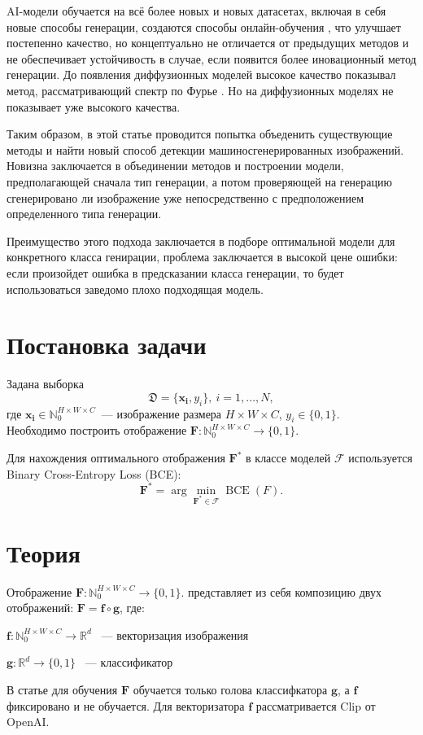 \documentclass{article}
\begin{document}
AI-модели обучается на всё более новых и новых датасетах, включая в себя новые способы генерации, создаются способы онлайн-обучения \cite{OnlineDetection}, что улучшает постепенно качество, но концептуально не отличается от предыдущих методов и не обеспечивает устойчивость в случае, если появится более иновационный метод генерации. До появления диффузионных моделей высокое качество показывал метод, рассматривающий спектр по Фурье \cite{ZeroShot}. Но на диффузионных моделях не показывает уже высокого качества.

Таким образом, в этой статье проводится попытка объеденить существующие методы и найти новый способ детекции машиносгенерированных изображений. Новизна заключается в объединении методов и построении модели, предполагающей сначала тип генерации, а потом проверяющей на генерацию сгенерировано ли изображение уже непосредственно с предположением определенного типа генерации.

Преимущество этого подхода заключается в подборе оптимальной модели для конкретного класса генирации, проблема заключается в высокой цене ошибки: если произойдет ошибка в предсказании класса генерации, то будет использоваться заведомо плохо подходящая модель.


\section{Постановка задачи}
\label{sec:problem_statement}
Задана выборка $$\mathfrak{D} = \{\bm{x_i}, y_i \},\ i= 1, ..., N,$$ где $\bm{x_i} \in \mathbb{N}_0^{H \times W \times C}$~--- изображение размера $H \times W \times C$, $y_i \in \{ 0, 1\}.$ \\

Необходимо построить отображение $\bm{F}: \mathbb{N}_0^{H \times W \times C} \rightarrow \{ 0, 1 \}.$

Для нахождения оптимального отображения \( \bm{F}^* \) в классе моделей \( \mathcal{F} \) используется Binary Cross-Entropy Loss (BCE):
\[
	\bm{F}^* = \arg\min_{\bm{F}^* \in \mathcal{F}} \operatorname{BCE}(F).
\]

\section{Теория}
\label{sec:theory}
Отображение $\bm{F}: \mathbb{N}_0^{H \times W \times C} \rightarrow \{ 0, 1 \}.$ представляет из себя композицию двух отображений: $\bm{F} = \bm{f} \circ \bm{g}$, где:
\begin{center}
    $\bm{f}: \mathbb{N}_0^{H \times W \times C} \rightarrow \mathbb{R}^{d}$ ~--- векторизация изображения
\end{center}
\begin{center}
    $\bm{g}: \mathbb{R}^{d} \rightarrow \{ 0, 1 \}$ ~--- классификатор
\end{center}
В статье для обучения $\bm{F}$ обучается только голова классифкатора $\bm{g}$, а $\bm{f}$ фиксировано и не обучается. Для векторизатора $\bm{f}$ рассматривается Clip от OpenAI. \\
\end{document}
